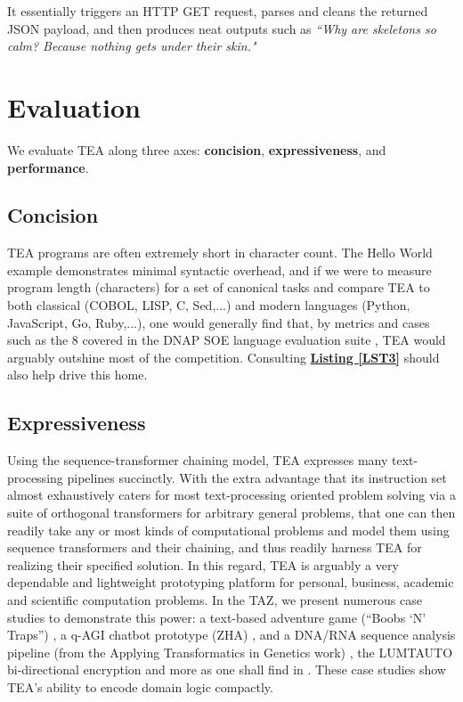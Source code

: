 \documentclass[sigplan,screen]{acmart}
\begin{document}
It essentially triggers an HTTP GET request, parses and cleans the returned JSON payload, and then produces neat outputs such as \textit{``Why are skeletons so calm?
Because nothing gets under their skin."}

\section{Evaluation}
\label{SEC6}

We evaluate TEA along three axes: \textbf{concision}, \textbf{expressiveness}, and \textbf{performance}.

\subsection{Concision}

TEA programs are often extremely short in character count. The Hello World example demonstrates minimal syntactic overhead, and if we were to measure program length (characters) for a set of canonical tasks and compare TEA to both classical (COBOL, LISP, C, Sed,...) and modern languages (Python, JavaScript, Go, Ruby,...), one would generally find that, by metrics and cases such as the 8 covered in the DNAP SOE language evaluation suite \cite{lutalo2023dnapsoe}, TEA would arguably outshine most of the competition. Consulting \textbf{\hyperref[LST3]{Listing \ref{LST3}}} should also help drive this home.

\subsection{Expressiveness}
Using the sequence-transformer chaining model, TEA expresses many text-processing pipelines succinctly. With the extra advantage that its instruction set almost exhaustively caters for most text-processing oriented problem solving via a suite of orthogonal transformers for arbitrary general problems, that one can then readily take any or most kinds of computational problems and model them using sequence transformers and their chaining, and thus readily harness TEA for realizing their specified solution. In this regard, TEA is arguably a very dependable and lightweight prototyping platform for personal, business, academic and scientific computation problems. In the TAZ, we present numerous case studies to demonstrate this power: a text-based adventure game (``Boobs `N' Traps'') \cite{lutalo_2025_rpg}, a q-AGI chatbot prototype (ZHA) \cite{lutalo2025unraveling}, and a DNA/RNA sequence analysis pipeline (from the Applying Transformatics in Genetics work) \cite{lutalo_2025_trans_genetics}, the LUMTAUTO bi-directional encryption \cite{lutalo_2025_grimlumtauto} and more as one shall find in \cite{Lutalo2024TEATAZ}. These case studies show TEA's ability to encode domain logic compactly.
\end{document}

